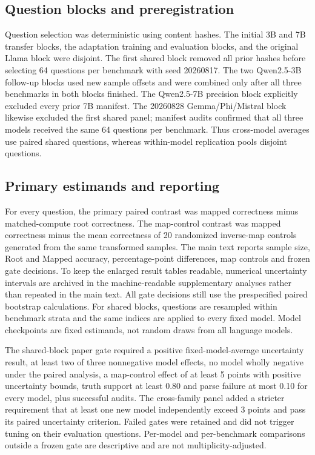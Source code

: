 \documentclass[11pt]{article}
\begin{document}
\subsection{Question blocks and preregistration}

Question selection was deterministic using content hashes. The initial 3B and 7B transfer blocks, the adaptation training and evaluation blocks, and the original Llama block were disjoint. The first shared block removed all prior hashes before selecting 64 questions per benchmark with seed 20260817. The two Qwen2.5-3B follow-up blocks used new sample offsets and were combined only after all three benchmarks in both blocks finished. The Qwen2.5-7B precision block explicitly excluded every prior 7B manifest. The 20260828 Gemma/Phi/Mistral block likewise excluded the first shared panel; manifest audits confirmed that all three models received the same 64 questions per benchmark. Thus cross-model averages use paired shared questions, whereas within-model replication pools disjoint questions.

\subsection{Primary estimands and reporting}

For every question, the primary paired contrast was mapped correctness minus matched-compute root correctness. The map-control contrast was mapped correctness minus the mean correctness of 20 randomized inverse-map controls generated from the same transformed samples. The main text reports sample size, Root and Mapped accuracy, percentage-point differences, map controls and frozen gate decisions. To keep the enlarged result tables readable, numerical uncertainty intervals are archived in the machine-readable supplementary analyses rather than repeated in the main text. All gate decisions still use the prespecified paired bootstrap calculations. For shared blocks, questions are resampled within benchmark strata and the same indices are applied to every fixed model. Model checkpoints are fixed estimands, not random draws from all language models.

The shared-block paper gate required a positive fixed-model-average uncertainty result, at least two of three nonnegative model effects, no model wholly negative under the paired analysis, a map-control effect of at least 5 points with positive uncertainty bounds, truth support at least 0.80 and parse failure at most 0.10 for every model, plus successful audits. The cross-family panel added a stricter requirement that at least one new model independently exceed 3 points and pass its paired uncertainty criterion. Failed gates were retained and did not trigger tuning on their evaluation questions. Per-model and per-benchmark comparisons outside a frozen gate are descriptive and are not multiplicity-adjusted.
\end{document}
